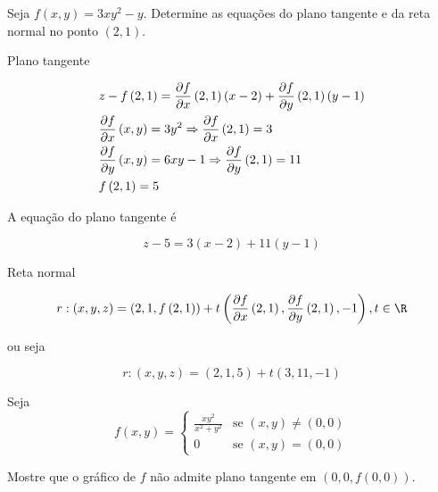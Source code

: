 \documentclass[11pt, oneside, a4paper]{gsm-l}
\begin{document}
\begin{exem}
Seja $f\left( {x,y} \right) = 3xy^2  - y$. Determine as equações do plano tangente e da reta normal no ponto $(2,1)$.
\end{exem}

\newpage 

\begin{sol}
Plano tangente

\[
\begin{gathered}
z - f\left( {2,1} \right) = \frac{{\partial f}}
{{\partial x}}\left( {2,1} \right)\left( {x - 2} \right) + \frac{{\partial f}}
{{\partial y}}\left( {2,1} \right)\left( {y - 1} \right) \hfill \\
  \frac{{\partial f}}{{\partial x}}\left( {x,y} \right) = 3y^2 \Rightarrow \frac{{\partial f}}
{{\partial x}}\left( {2,1} \right) = 3 \hfill \\
\frac{{\partial f}}
{{\partial y}}\left( {x,y} \right) = 6xy - 1   \Rightarrow \frac{{\partial f}}
{{\partial y}}\left( {2,1} \right) = 11 \hfill \\
f\left( {2,1} \right) = 5 \hfill \\
\end{gathered}
\]

A equação do plano tangente é

\[
z - 5 = 3\left( {x - 2} \right) + 11\left( {y - 1} \right)
\]

Reta normal

\[
r: \left( {x,y,z} \right) = \left( {2,1,f\left( {2,1} \right)} \right) + t\left( {\frac{{\partial f}}
{{\partial x}}\left( {2,1} \right),\frac{{\partial f}}
{{\partial y}}\left( {2,1} \right), - 1} \right),t \in \R
\]

ou seja

\[
    r:\left( {x,y,z} \right) = \left( {2,1,5} \right) + t\left( {3,11, - 1} \right)
\]

\end{sol}

\begin{exem}
Seja
\begin{equation*}
f(x,y)=\left\{ \begin{array}{cl}\displaystyle
        \frac{{xy^2}}{{x^2 + y^2 }} & \textrm{se }\left( {x,y} \right) \ne \left( {0,0} \right)\\
        0 & \textrm{se }\left( {x,y} \right) = \left( {0,0} \right)\end{array}\right.
\end{equation*}

    Mostre que o gráfico de $f$ não admite plano tangente em $\left( {0,0,f\left( {0,0} \right)} \right)$.
\end{exem}
\end{document}
